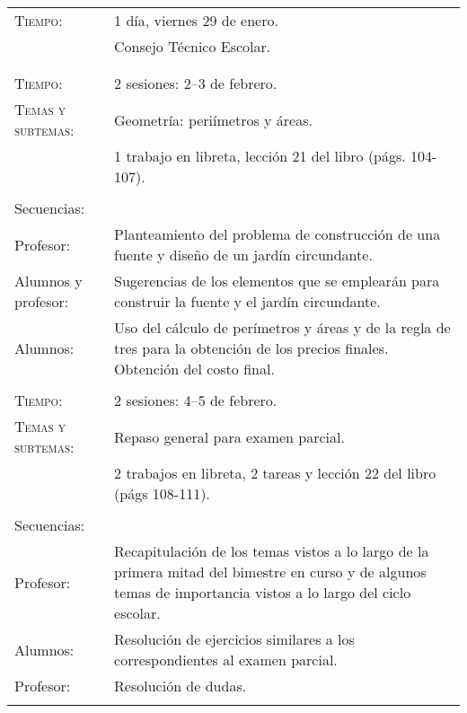 \documentclass[letterpaper,10pt]{article}
\begin{document}
\vfill

\begin{tabular}[t]{R{0.25\textwidth}p{0.71\textwidth}}

    \textsc{Tiempo:}& 1 d\'ia, viernes 29 de enero. \\
                    & {\Large \sc Consejo T\'ecnico Escolar.} \\ 
\\ \hline \\
\textsc{Tiempo:}          & 2 sesiones: 2--3  de febrero. \\
    \textsc{Temas y subtemas:}& Geometr\'ia: peri\'imetros y \'areas.\\    
    & 1 trabajo en libreta, lecci\'on 21 del libro 
    (p\'ags. 104-107). \\ \\
    \large{\sc Secuencias:} \\
    
    Profesor:   & Planteamiento del problema de construcci\'on de una fuente y
    dise\~no de un jard\'in circundante. \\
    
    Alumnos y profesor:& Sugerencias de los elementos que se emplear\'an para 
    construir la fuente y el jard\'in circundante. \\
    
    Alumnos:    & Uso del c\'alculo de per\'imetros y \'areas y de la regla de
    tres para la obtenci\'on de los precios finales. Obtenci\'on del costo 
    final.
\\ \hline \\
\textsc{Tiempo:}          & 2 sesiones: 4--5  de febrero. \\
    \textsc{Temas y subtemas:}& Repaso general para examen parcial.\\    
    & 2 trabajos en libreta, 2 tareas y lecci\'on 22 
    del libro (p\'ags 108-111). \\ \\
    \large{\sc Secuencias:} \\
    Profesor:   & Recapitulaci\'on de los temas vistos a lo largo de la primera 
    mitad del bimestre en curso y de algunos temas de importancia vistos a lo 
    largo del ciclo escolar. \\
    
    Alumnos:    & Resoluci\'on de ejercicios similares a los correspondientes al
    examen parcial. \\
    Profesor:   & Resoluci\'on de dudas. \\
\hline \\


\end{tabular}
\end{document}
